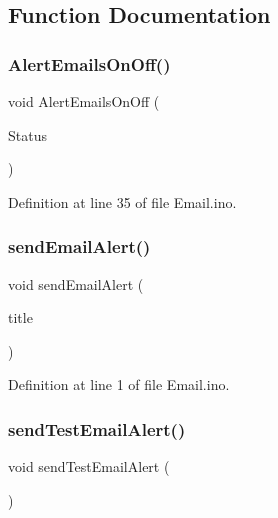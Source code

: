 \subsection{Function Documentation}
\mbox{\label{_email_8ino_a693fd3297c0c1cceac3c22fe94fa305b}} 
\subsubsection{\texorpdfstring{AlertEmailsOnOff()}{AlertEmailsOnOff()}}
{\footnotesize\ttfamily void Alert\+Emails\+On\+Off (\begin{DoxyParamCaption}\item[{bool}]{Status }\end{DoxyParamCaption})}



Definition at line 35 of file Email.\+ino.

\mbox{\label{_email_8ino_a43ec10418608714b8fc70c540802f5bd}} 
\subsubsection{\texorpdfstring{sendEmailAlert()}{sendEmailAlert()}}
{\footnotesize\ttfamily void send\+Email\+Alert (\begin{DoxyParamCaption}\item[{const \+\_\+\+\_\+\+Flash\+String\+Helper $\ast$}]{title }\end{DoxyParamCaption})}



Definition at line 1 of file Email.\+ino.

\mbox{\label{_email_8ino_a88a43289031ede97c4f37070c9df991b}} 
\subsubsection{\texorpdfstring{sendTestEmailAlert()}{sendTestEmailAlert()}}
{\footnotesize\ttfamily void send\+Test\+Email\+Alert (\begin{DoxyParamCaption}{ }\end{DoxyParamCaption})}



